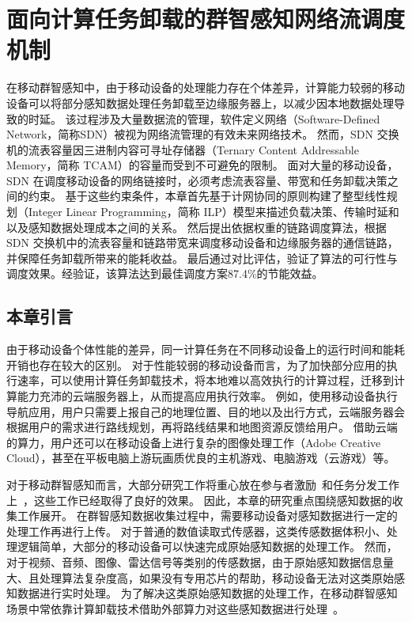 \chapter{面向计算任务卸载的群智感知网络流调度机制}

在移动群智感知中，由于移动设备的处理能力存在个体差异，计算能力较弱的移动设备可以将部分感知数据处理任务卸载至边缘服务器上，以减少因本地数据处理导致的时延。
该过程涉及大量数据流的管理，软件定义网络（Software-Defined Network，简称SDN）被视为网络流管理的有效未来网络技术。
然而，SDN 交换机的流表容量因三进制内容可寻址存储器（Ternary Content Addressable Memory，简称 TCAM）的容量而受到不可避免的限制。
面对大量的移动设备，SDN 在调度移动设备的网络链接时，必须考虑流表容量、带宽和任务卸载决策之间的约束。
基于这些约束条件，本章首先基于计网协同的原则构建了整型线性规划（Integer Linear Programming，简称 ILP）模型来描述负载决策、传输时延和以及感知数据处理成本之间的关系。
然后提出依据权重的链路调度算法，根据 SDN 交换机中的流表容量和链路带宽来调度移动设备和边缘服务器的通信链路，并保障任务卸载所带来的能耗收益。
最后通过对比评估，验证了算法的可行性与调度效果。经验证，该算法达到最佳调度方案87.4\%的节能效益。

\section{本章引言}

由于移动设备个体性能的差异，同一计算任务在不同移动设备上的运行时间和能耗开销也存在较大的区别。
对于性能较弱的移动设备而言，为了加快部分应用的执行速率，可以使用计算任务卸载技术，将本地难以高效执行的计算过程，迁移到计算能力充沛的云端服务器上，从而提高应用执行效率。
例如，使用移动设备执行导航应用，用户只需要上报自己的地理位置、目的地以及出行方式，云端服务器会根据用户的需求进行路线规划，再将路线结果和地图资源反馈给用户。
借助云端的算力，用户还可以在移动设备上进行复杂的图像处理工作（Adobe Creative Cloud），甚至在平板电脑上游玩画质优良的主机游戏、电脑游戏（云游戏）等。

对于移动群智感知而言，大部分研究工作将重心放在参与者激励~\cite{CNKI:JiaChaopeng, DBLP:journals/comsur/ZhangYSLTXM16, CNKI:WuMCSIncentive}和任务分发工作上~\cite{DBLP:conf/huc/LiuGWWYZ16, DBLP:conf/infocom/Xiao0HWL15, DBLP:conf/mass/LiLW15}，这些工作已经取得了良好的效果。
因此，本章的研究重点围绕感知数据的收集工作展开。
在群智感知数据收集过程中，需要移动设备对感知数据进行一定的处理工作再进行上传。
对于普通的数值读取式传感器，这类传感数据体积小、处理逻辑简单，大部分的移动设备可以快速完成原始感知数据的处理工作。
然而，对于视频、音频、图像、雷达信号等类别的传感数据，由于原始感知数据信息量大、且处理算法复杂度高，如果没有专用芯片的帮助，移动设备无法对这类原始感知数据进行实时处理。
为了解决这类原始感知数据的处理工作，在移动群智感知场景中常依靠计算卸载技术借助外部算力对这些感知数据进行处理~\cite{Lee:2013fj, Linthicum:2017vv, Kumar:2013dq}。

